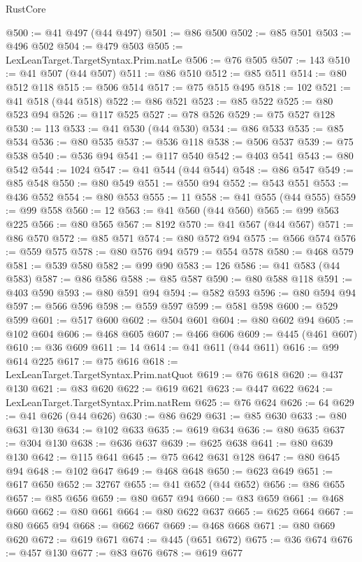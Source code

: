 \begin{lexlean}{RustCore}
\begin{coremodule}
@500 := @41 @497 (@44 @497)
@501 := @86 @500
@502 := @85 @501
@503 := @496 @502
@504 := @479 @503
@505 := LexLeanTarget.TargetSyntax.Prim.natLe
@506 := @76 @505
@507 := 143
@510 := @41 @507 (@44 @507)
@511 := @86 @510
@512 := @85 @511
@514 := @80 @512 @118
@515 := @506 @514
@517 := @75 @515 @495
@518 := 102
@521 := @41 @518 (@44 @518)
@522 := @86 @521
@523 := @85 @522
@525 := @80 @523 @94
@526 := @117 @525
@527 := @78 @526
@529 := @75 @527 @128
@530 := 113
@533 := @41 @530 (@44 @530)
@534 := @86 @533
@535 := @85 @534
@536 := @80 @535
@537 := @536 @118
@538 := @506 @537
@539 := @75 @538
@540 := @536 @94
@541 := @117 @540
@542 := @403 @541
@543 := @80 @542
@544 := 1024
@547 := @41 @544 (@44 @544)
@548 := @86 @547
@549 := @85 @548
@550 := @80 @549
@551 := @550 @94
@552 := @543 @551
@553 := @436 @552
@554 := @80 @553
@555 := 11
@558 := @41 @555 (@44 @555)
@559 := @99 @558
@560 := 12
@563 := @41 @560 (@44 @560)
@565 := @99 @563 @225
@566 := @80 @565
@567 := 8192
@570 := @41 @567 (@44 @567)
@571 := @86 @570
@572 := @85 @571
@574 := @80 @572 @94
@575 := @566 @574
@576 := @559 @575
@578 := @80 @576 @94
@579 := @554 @578
@580 := @468 @579
@581 := @539 @580
@582 := @99 @90
@583 := 126
@586 := @41 @583 (@44 @583)
@587 := @86 @586
@588 := @85 @587
@590 := @80 @588 @118
@591 := @403 @590
@593 := @80 @591 @94
@594 := @582 @593
@596 := @80 @594 @94
@597 := @566 @596
@598 := @559 @597
@599 := @581 @598
@600 := @529 @599
@601 := @517 @600
@602 := @504 @601
@604 := @80 @602 @94
@605 := @102 @604
@606 := @468 @605
@607 := @466 @606
@609 := @445 (@461 @607)
@610 := @36 @609
@611 := 14
@614 := @41 @611 (@44 @611)
@616 := @99 @614 @225
@617 := @75 @616
@618 := LexLeanTarget.TargetSyntax.Prim.natQuot
@619 := @76 @618
@620 := @437 @130
@621 := @83 @620
@622 := @619 @621
@623 := @447 @622
@624 := LexLeanTarget.TargetSyntax.Prim.natRem
@625 := @76 @624
@626 := 64
@629 := @41 @626 (@44 @626)
@630 := @86 @629
@631 := @85 @630
@633 := @80 @631 @130
@634 := @102 @633
@635 := @619 @634
@636 := @80 @635
@637 := @304 @130
@638 := @636 @637
@639 := @625 @638
@641 := @80 @639 @130
@642 := @115 @641
@645 := @75 @642 @631 @128
@647 := @80 @645 @94
@648 := @102 @647
@649 := @468 @648
@650 := @623 @649
@651 := @617 @650
@652 := 32767
@655 := @41 @652 (@44 @652)
@656 := @86 @655
@657 := @85 @656
@659 := @80 @657 @94
@660 := @83 @659
@661 := @468 @660
@662 := @80 @661
@664 := @80 @622 @637
@665 := @625 @664
@667 := @80 @665 @94
@668 := @662 @667
@669 := @468 @668
@671 := @80 @669 @620
@672 := @619 @671
@674 := @445 (@651 @672)
@675 := @36 @674
@676 := @457 @130
@677 := @83 @676
@678 := @619 @677

\end{coremodule}
\end{lexlean}
